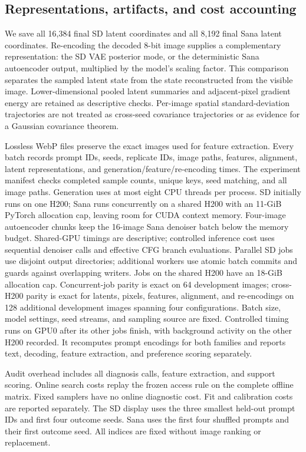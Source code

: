 \subsection{Representations, artifacts, and cost accounting}
We save all 16,384 final SD latent coordinates and all 8,192 final Sana latent
coordinates. Re-encoding the decoded 8-bit image supplies a complementary
representation: the SD VAE posterior mode, or the deterministic Sana
autoencoder output, multiplied by the model's scaling factor. This comparison
separates the sampled latent state from the state reconstructed from the
visible image. Lower-dimensional pooled latent summaries and adjacent-pixel
gradient energy are retained as descriptive checks. Per-image spatial
standard-deviation trajectories are not treated as cross-seed covariance
trajectories or as evidence for a Gaussian covariance theorem.

Lossless WebP files preserve the exact images used for feature extraction.
Every batch records prompt IDs, seeds, replicate IDs, image paths, features,
alignment, latent representations, and generation/feature/re-encoding times.
The experiment manifest checks completed sample counts, unique keys, seed
matching, and all image paths. Generation uses at most eight CPU threads per
process. SD initially runs on one H200; Sana runs concurrently on a shared H200 with an
11-GiB PyTorch allocation cap, leaving room for CUDA context memory.
Four-image autoencoder chunks keep the 16-image Sana denoiser batch below the
memory budget. Shared-GPU timings are descriptive; controlled inference cost
uses sequential denoiser calls and effective CFG branch evaluations.
Parallel SD jobs use disjoint output directories; additional workers use atomic
batch commits and guards against overlapping writers. Jobs on the shared H200 have an
18-GiB allocation cap. Concurrent-job
parity is exact on 64 development images; cross-H200 parity is exact for latents,
pixels, features, alignment, and re-encodings on 128 additional development
images spanning four configurations. Batch size, model settings, seed streams,
and sampling source are fixed. Controlled timing runs on GPU0 after its other
jobs finish, with background activity on the other H200 recorded. It recomputes
prompt encodings for both families and reports text, decoding, feature
extraction, and preference scoring separately.

Audit overhead includes all diagnosis calls, feature extraction, and support
scoring. Online search costs replay the frozen access rule on the complete
offline matrix. Fixed samplers have no online diagnostic cost. Fit and
calibration costs are reported separately. The SD display uses the three
smallest held-out prompt IDs and first four outcome seeds. Sana uses the
first four shuffled prompts and their first outcome seed. All indices
are fixed without image ranking or replacement.

